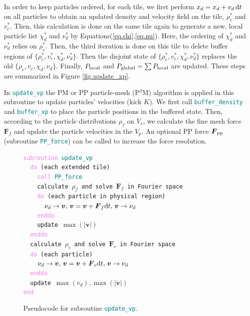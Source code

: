 \documentclass[10pt,twocolumn,preprint]{emulateapj}
\newcommand{\bs}{\boldsymbol}
\newcommand{\tcv}{\textcolor{violet}}
\newcommand{\tcx}{\textcolor{teal}}
\begin{document}
In order to keep particles ordered, for each tile, we first perform $x_d=x_d+v_d\,{\rm d}t$ on all particles to obtain an updated density and velocity field on the tile,  $\rho_c^*$ and $v_c^*$. Then, this calculation is done on the same tile again to generate a new, local particle list $\chi_d^*$ and $\nu_d^*$ by Equations(\ref{eq.chi},\ref{eq.nu}). Here, the ordering of  $\chi_d^*$ and $\nu_d^*$ relies on  $\rho_c^*$. Then, the third iteration is done on this tile to delete buffer regions of  $\{\rho_c^*,v_c^*,\chi_d^*,\nu_d^*\}$.  Then the disjoint state of $\{\rho_c^*,v_c^*,\chi_d^*,\nu_d^*\}$ replaces the old $\{\rho_c,v_c,\chi_d,\nu_d\}$. Finally, $P_{\rm local}$ and $P_{\rm global}=\sum P_{\rm local}$ are updated. These steps are summarized in Figure \ref{fig.update_xp}.

In {\tt \tcx{update\_vp}}
the PM or PP particle-mesh (P$^3$M) algorithm is applied in this subroutine to update particles' velocities (kick $K$).
We first call {\tt \tcx{buffer\_density}} and {\tt \tcx{buffer\_xp}} to place the particle positions in the buffered state. Then, according to the particle distributions $\rho_f$ on $V_e$, we calculate the fine mesh force ${\bs F}_f$ and update the particle velocities in the $V_p$. An optional PP force ${\bs F}_{\rm pp}$ (subroutine {\tt \tcx{PP\_force}}) can be called to increase the force resolution.

\begin{figure}[t]
{\tt \tcv{subroutine} \tcx{update\_vp}\\
\indent \ \ \tcv{do} (each extended tile)\\
\indent \ \ \ \ \tcv{call} \tcx{PP\_force}\\
\indent \ \ \ \ calculate $\rho_f$ and solve ${\bs F}_f$ in Fourier space\\
\indent \ \ \ \ \tcv{do} (each particle in physical region)\\
\indent \ \ \ \ \ \ $\nu_d\rightarrow{\bs v},\,{\bs v}={\bs v}+{\bs F}_f{\rm d}t,\, {\bs v}\rightarrow\nu_d$\\
\indent \ \ \ \ \tcv{enddo}\\
\indent \ \ \ \ update $\max(|{\dot{\bs v}}|)$\\
\indent \ \ \tcv{enddo}\\
\indent \ \ calculate $\rho_c$ and solve ${\bs F}_c$ in Fourier space\\
\indent \ \ \tcv{do} (each particle)\\
\indent \ \ \ \ $\nu_d\rightarrow{\bs v},\,{\bs v}={\bs v}+{\bs F}_c{\rm d}t,\, {\bs v}\rightarrow\nu_d$\\
\indent \ \ \tcv{enddo}\\
\indent \ \ update $\max(v_d),\max(|{\dot{\bs v}}|)$\\
\tcv{end}\\}
\caption{Pseudocode for subroutine {\tt \tcx{update\_vp}}.}
\label{fig.update_vp}
\end{figure}
\end{document}
